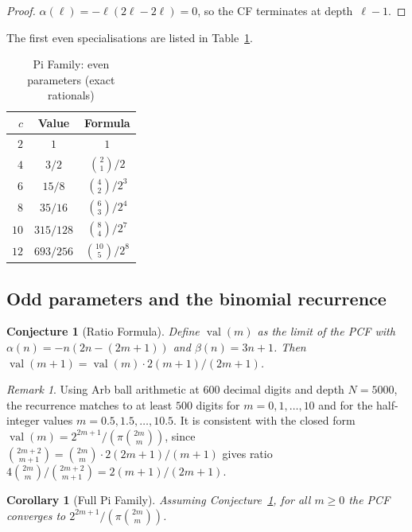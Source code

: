\documentclass[11pt,a4paper]{article}
\theoremstyle{plain}
\newtheorem{corollary}[theorem]{Corollary}
\newtheorem{conjecture}[theorem]{Conjecture}
\theoremstyle{definition}
\theoremstyle{remark}
\newtheorem{remark}[theorem]{Remark}
\begin{document}
\begin{proof}
$\alpha(\ell) = -\ell(2\ell - 2\ell) = 0$, so the CF terminates
at depth~$\ell{-}1$.
\end{proof}

The first even specialisations are listed in Table~\ref{tab:parity}.

\begin{table}[ht]
\centering
\caption{Pi Family: even parameters (exact rationals)}\label{tab:parity}
\begin{tabular}{@{}rcc@{}}
\toprule
$c$ & Value & Formula \\
\midrule
$2$ & $1$ & $1$ \\
$4$ & $3/2$ & $\binom{2}{1}/2$ \\
$6$ & $15/8$ & $\binom{4}{2}/2^3$ \\
$8$ & $35/16$ & $\binom{6}{3}/2^4$ \\
$10$ & $315/128$ & $\binom{8}{4}/2^7$ \\
$12$ & $693/256$ & $\binom{10}{5}/2^8$ \\
\bottomrule
\end{tabular}
\end{table}

\subsection{Odd parameters and the binomial recurrence}

\begin{conjecture}[Ratio Formula]\label{conj:ratio}
Define $\operatorname{val}(m)$ as the limit of the PCF with
$\alpha(n) = -n(2n{-}(2m{+}1))$ and $\beta(n) = 3n+1$.
Then $\operatorname{val}(m{+}1) = \operatorname{val}(m)\cdot 2(m{+}1)/(2m{+}1)$.
\end{conjecture}

\begin{remark}
Using Arb ball arithmetic at $600$ decimal digits and depth $N=5000$,
the recurrence matches to at least $500$ digits for $m = 0,1,\ldots,10$
and for the half-integer values $m = 0.5,1.5,\ldots,10.5$.
It is consistent with the closed form
$\operatorname{val}(m) = 2^{2m+1}/(\pi\binom{2m}{m})$, since
$\binom{2m+2}{m+1} = \binom{2m}{m}\cdot 2(2m{+}1)/(m{+}1)$ gives
ratio $4\binom{2m}{m}/\binom{2m+2}{m+1} = 2(m{+}1)/(2m{+}1)$.
\end{remark}

\begin{corollary}[Full Pi Family]\label{cor:pi}
Assuming Conjecture~\ref{conj:ratio}, for all $m \ge 0$ the PCF
converges to $2^{2m+1}/(\pi\binom{2m}{m})$.
\end{corollary}
\end{document}
